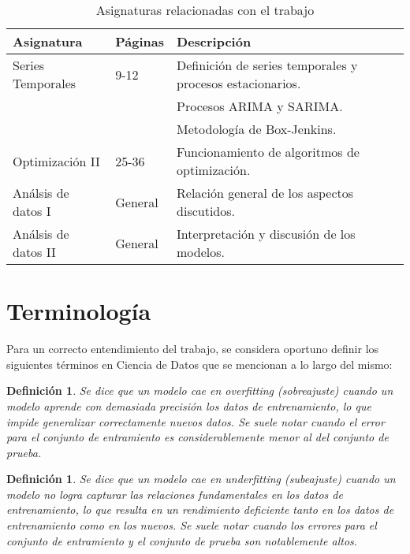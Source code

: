 \documentclass[12pt,twoside]{article}
\newtheorem{definition}[theorem]{Definición}
\begin{document}
\begin{table}[ht] 
\centering
\begin{tabular}{llll} 
  \hline
 Asignatura & Páginas & Descripción  \\ 
  \hline
Series Temporales   & 9-12 & Definición de series temporales y procesos estacionarios. \\
& & Procesos ARIMA y SARIMA. \\
& & Metodología de Box-Jenkins.  \\
Optimización II  & 25-36 & Funcionamiento de algoritmos de optimización. \\
Análsis de datos I  & General & Relación general de los aspectos discutidos. \\ 
Análsis de datos II & General & Interpretación y discusión de los modelos. \\ 
\hline
\end{tabular}
\caption{Asignaturas relacionadas con el trabajo} \label{tab{03}}
\end{table}

\newpage

\section{Terminología}

Para un correcto entendimiento del trabajo, se considera oportuno definir los siguientes términos en Ciencia de Datos que se mencionan a lo largo del mismo:

\begin{definition}\label{def:overfitting}
Se dice que un modelo cae en \textit{overfitting} (sobreajuste) cuando un modelo aprende con demasiada precisión los datos de entrenamiento, lo que impide generalizar correctamente nuevos datos. Se suele notar cuando el error para el conjunto de entramiento es considerablemente menor al del conjunto de prueba.
\end{definition}

\begin{definition}\label{def:underfitting}
Se dice que un modelo cae en \textit{underfitting} (subeajuste) cuando un modelo no logra capturar las relaciones fundamentales en los datos de entrenamiento, lo que resulta en un rendimiento deficiente tanto en los datos de entrenamiento como en los nuevos. Se suele notar cuando los errores para el conjunto de entramiento y el conjunto de prueba son notablemente altos.
\end{definition}
\end{document}
